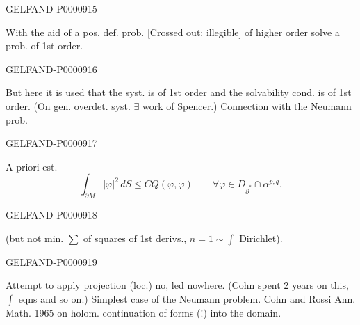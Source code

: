 \begin{GelfandAdjacentEvidence}{GELFAND-P000091}{5}

With the aid of a pos. def. prob. [Crossed out: illegible] of higher order solve a prob. of 1st order.
\end{GelfandAdjacentEvidence}
\begin{GelfandAdjacentEvidence}{GELFAND-P000091}{6}

But here it is used that the syst. is of 1st order and the solvability cond. is of 1st order.
(On gen. overdet. syst. $\exists$ work of Spencer.)
Connection with the Neumann prob.
\end{GelfandAdjacentEvidence}
\begin{GelfandAdjacentEvidence}{GELFAND-P000091}{7}

A priori est.
\begin{equation*}
\int_{\partial M}|\varphi|^2\,dS\le C Q(\varphi,\varphi)
\qquad\forall\varphi\in D_{\bar\partial^*}\cap\alpha^{p,q}.
\end{equation*}
\end{GelfandAdjacentEvidence}
\begin{GelfandAdjacentEvidence}{GELFAND-P000091}{8}

(but not min. $\sum$ of squares of 1st derivs., $n=1\sim\int$ Dirichlet).
\end{GelfandAdjacentEvidence}
\begin{GelfandAdjacentEvidence}{GELFAND-P000091}{9}

Attempt to apply projection (loc.) no, led nowhere.
(Cohn spent 2 years on this, $\int$ eqns and so on.)
Simplest case of the Neumann problem.
Cohn and Rossi Ann. Math. 1965 on holom. continuation of forms (!) into the domain.
\end{GelfandAdjacentEvidence}
